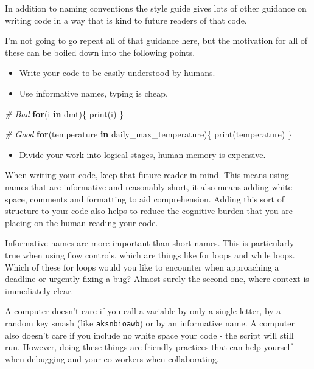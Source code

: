 \documentclass[
  12pt,
]{book}
\newenvironment{Shaded}{\begin{snugshade}}{\end{snugshade}}
\newcommand{\CommentTok}[1]{\textcolor[rgb]{0.56,0.35,0.01}{\textit{#1}}}
\newcommand{\ControlFlowTok}[1]{\textcolor[rgb]{0.13,0.29,0.53}{\textbf{#1}}}
\newcommand{\FunctionTok}[1]{\textcolor[rgb]{0.00,0.00,0.00}{#1}}
\newcommand{\NormalTok}[1]{#1}
\providecommand{\tightlist}{%
  \setlength{\itemsep}{0pt}\setlength{\parskip}{0pt}}
\begin{document}
In addition to naming conventions the style guide gives lots of other guidance on writing code in a way that is kind to future readers of that code.

I'm not going to go repeat all of that guidance here, but the motivation for all of these can be boiled down into the following points.

\begin{itemize}
\item
  Write your code to be easily understood by humans.
\item
  Use informative names, typing is cheap.
\end{itemize}

\begin{Shaded}
\begin{Highlighting}[]
\CommentTok{\# Bad}
\ControlFlowTok{for}\NormalTok{(i }\ControlFlowTok{in}\NormalTok{ dmt)\{}
  \FunctionTok{print}\NormalTok{(i)}
\NormalTok{\}}

\CommentTok{\# Good}
\ControlFlowTok{for}\NormalTok{(temperature }\ControlFlowTok{in}\NormalTok{ daily\_max\_temperature)\{}
  \FunctionTok{print}\NormalTok{(temperature)}
\NormalTok{\}}
\end{Highlighting}
\end{Shaded}

\begin{itemize}
\tightlist
\item
  Divide your work into logical stages, human memory is expensive.
\end{itemize}

When writing your code, keep that future reader in mind. This means using names that are informative and reasonably short, it also means adding white space, comments and formatting to aid comprehension. Adding this sort of structure to your code also helps to reduce the cognitive burden that you are placing on the human reading your code.

Informative names are more important than short names. This is particularly true when using flow controls, which are things like for loops and while loops. Which of these for loops would you like to encounter when approaching a deadline or urgently fixing a bug? Almost surely the second one, where context is immediately clear.

A computer doesn't care if you call a variable by only a single letter, by a random key smash (like \texttt{aksnbioawb}) or by an informative name. A computer also doesn't care if you include no white space your code - the script will still run. However, doing these things are friendly practices that can help yourself when debugging and your co-workers when collaborating.
\end{document}
